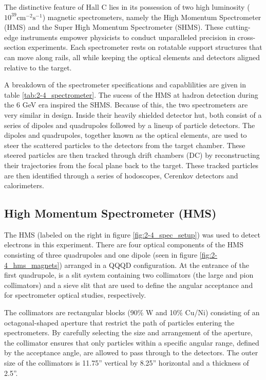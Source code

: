 \documentclass[
]{report}
\begin{document}
The distinctive feature of Hall C lies in its possession of two high
luminosity (\(10^{39}\text{cm}^{-2}\text{s}^{-1}\)) magnetic
spectrometers, namely the High Momentum Spectrometer (HMS) and the Super
High Momentum Spectrometer (SHMS). These cutting-edge instruments
empower physicists to conduct unparalleled precision in cross-section
experiments. Each spectrometer rests on rotatable support structures
that can move along rails, all while keeping the optical elements and
detectors aligned relative to the target.



A breakdown of the spectrometer specifications and capablilities are
given in table \ref{tab:2-4_spectrometer}. The sucess of the HMS at
hadron detection during the 6 GeV era inspired the SHMS. Because of
this, the two spectrometers are very similar in design. Inside their
heavily shielded detector hut, both consist of a series of dipoles and
quadrupoles followed by a lineup of particle detectors. The dipoles and
quadrupoles, together known as the optical elements, are used to steer
the scattered particles to the detectors from the target chamber. These
steered particles are then tracked through drift chambers (DC) by
reconstructing their trajectories from the focal plane back to the
target. These tracked particles are then identified through a series of
hodoscopes, Cerenkov detectors and calorimeters.



\hypertarget{high-momentum-spectrometer-hms}{%
\subsection{High Momentum Spectrometer
(HMS)}\label{high-momentum-spectrometer-hms}}

The HMS (labeled on the right in figure \ref{fig:2-4_spec_setup}) was
used to detect electrons in this experiment. There are four optical
components of the HMS consisting of three quadrupoles and one dipole
(seen in figure \ref{fig:2-4_hms_magnets}) arranged in a QQQD
configuration. At the entrance of the first quadrupole, is a slit system
containing two collimators (the large and pion collimators) and a sieve
slit that are used to define the angular acceptance and for spectrometer
optical studies, respectively.



The collimators are rectangular blocks (90\% W and 10\% Cu/Ni)
consisting of an octagonal-shaped aperture that restrict the path of
particles entering the spectrometers. By carefully selecting the size
and arrangement of the aperture, the collimator ensures that only
particles within a specific angular range, defined by the acceptance
angle, are allowed to pass through to the detectors. The outer size of
the collimators is 11.75'' vertical by 8.25'' horizontal and a thickness
of 2.5''.
\end{document}
